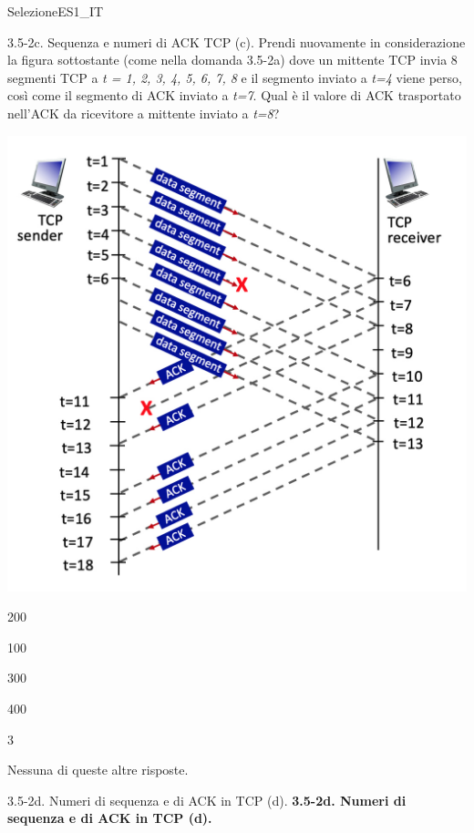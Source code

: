 \documentclass[a4paper]{article}
\begin{document}
\begin{quiz}{SelezioneES1\_IT}
\begin{multi}[points=1,shuffle]{3.5-2c. Sequenza e numeri di ACK TCP (c).}
Prendi nuovamente in considerazione la figura sottostante (come nella domanda 3.5-2a) dove un mittente TCP invia 8 segmenti TCP a \emph{t = 1, 2, 3, 4, 5, 6, 7, 8} e il segmento inviato a \emph{t=4} viene perso, così come il segmento di ACK inviato a \emph{t=7}. Qual è il valore di ACK trasportato nell'ACK da ricevitore a mittente inviato a \emph{t=8}?
\begin{center}
	\includegraphics[width=\linewidth]{figs/tcp_seq_ack_1.jpg}
\end{center}
\item 200
\item 100
\item* 300
\item 400
\item 3
\item Nessuna di queste altre risposte.
\end{multi}

\begin{multi}[points=1,shuffle]{3.5-2d. Numeri di sequenza e di ACK in TCP (d).}
\textbf{3.5-2d. Numeri di sequenza e di ACK in TCP (d).}


\end{multi}
\end{quiz}
\end{document}
